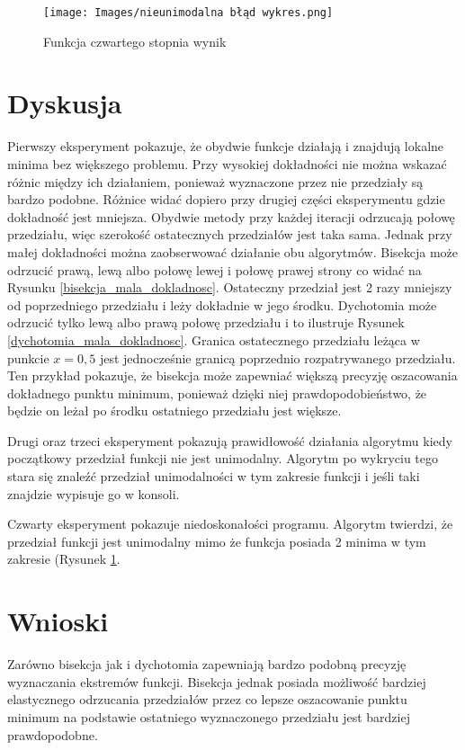 \documentclass{classrep}
\begin{document}
\begin{figure}[H]
    \centering
    \texttt{[image: Images/nieunimodalna błąd wykres.png]}
    \caption[Funkcja czwartego stopnia wynik]{Funkcja czwartego stopnia wynik}
    \label{wynik_czwartego}
\end{figure}

\section{Dyskusja}

Pierwszy eksperyment pokazuje, że obydwie funkcje działają i znajdują lokalne minima bez większego problemu. Przy wysokiej dokładności nie można wskazać różnic między ich działaniem, ponieważ wyznaczone przez nie przedziały są bardzo podobne. Różnice widać dopiero przy drugiej części eksperymentu gdzie dokładność jest mniejsza. Obydwie metody przy każdej iteracji odrzucają połowę przedziału, więc szerokość ostatecznych przedziałów jest taka sama. Jednak przy małej dokładności można zaobserwować działanie obu algorytmów. Bisekcja może odrzucić prawą, lewą albo połowę lewej i połowę prawej strony co widać na Rysunku \ref{bisekcja_mala_dokladnosc}. Ostateczny przedział jest 2 razy mniejszy od poprzedniego przedziału i leży dokładnie w jego środku. Dychotomia może odrzucić tylko lewą albo prawą połowę przedziału i to ilustruje Rysunek \ref{dychotomia_mala_dokladnosc}. Granica ostatecznego przedziału leżąca w punkcie $x=0,5$ jest jednocześnie granicą poprzednio rozpatrywanego przedziału. Ten przykład pokazuje, że bisekcja może zapewniać większą precyzję oszacowania dokładnego punktu minimum, ponieważ dzięki niej prawdopodobieństwo, że będzie on leżał po środku ostatniego przedziału jest większe.

Drugi oraz trzeci eksperyment pokazują prawidłowość działania algorytmu kiedy początkowy przedział funkcji nie jest unimodalny. Algorytm po wykryciu tego stara się znaleźć przedział unimodalności w tym zakresie funkcji i jeśli taki znajdzie wypisuje go w konsoli.

Czwarty eksperyment pokazuje niedoskonałości programu. Algorytm twierdzi, że przedział funkcji jest unimodalny mimo że funkcja posiada 2 minima w tym zakresie (Rysunek \ref{wynik_czwartego}.

\section{Wnioski}
Zarówno bisekcja jak i dychotomia zapewniają bardzo podobną precyzję wyznaczania ekstremów funkcji. Bisekcja jednak posiada możliwość bardziej elastycznego odrzucania przedziałów przez co lepsze oszacowanie punktu minimum na podstawie ostatniego wyznaczonego przedziału jest bardziej prawdopodobne.
\end{document}
